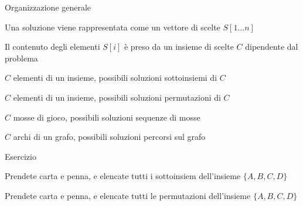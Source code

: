 \begin{frame}{Organizzazione generale}
    
\begin{myboxtitle}
\BI
\item Una soluzione viene rappresentata come un \alert{vettore di scelte $S[1 \ldots n]$} 
\item  Il contenuto degli elementi $S[i]$ è preso da un \alert{insieme di scelte $C$} dipendente dal problema 
\EI
\end{myboxtitle}

\begin{myboxtitle}[Esempi]
\BI
\item $C$ elementi di un insieme, possibili soluzioni \alert{sottoinsiemi} di $C$
\item $C$ elementi di un insieme, possibili soluzioni \alert{permutazioni} di $C$
\item $C$ mosse di gioco, possibili soluzioni \alert{sequenze di mosse}
\item $C$ archi di un grafo, possibili soluzioni \alert{percorsi sul grafo}
\EI
\end{myboxtitle}

\end{frame}

\begin{frame}{Esercizio}
    
\begin{myboxtitle}[Sottoinsiemi]
Prendete carta e penna, e elencate tutti i sottoinsiem dell'insieme $\{ A, B, C, D \}$
\end{myboxtitle}

\begin{myboxtitle}[Permutazioni]
Prendete carta e penna, e elencate tutti le permutazioni dell'insieme $\{ A, B, C, D \}$
\end{myboxtitle}

\end{frame}


